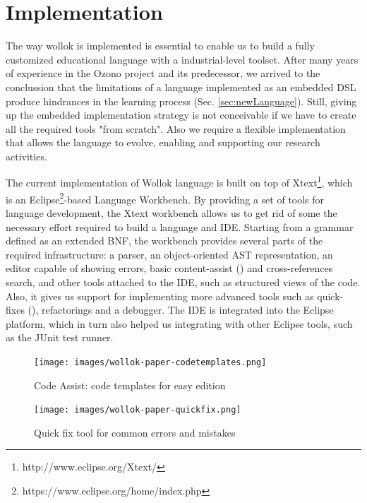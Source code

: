 \section{Implementation}
\label{sec:implementation}

The way wollok is implemented is essential to enable us to build a fully customized educational language with a industrial-level toolset.
After many years of experience in the Ozono project and its predecessor, we arrived to the conclussion that
the limitations of a language implemented as an embedded DSL produce hindrances in the learning process (\cf Sec. \ref{sec:newLanguage}).
Still, giving up the embedded implementation strategy is not conceivable if we have to create all the required tools "from scratch".
Also we require a flexible implementation that allows the language to evolve, enabling and supporting our research activities.

The current implementation of Wollok language is built on top of Xtext\footnote{http://www.eclipse.org/Xtext/}, 
which is an Eclipse\footnote{https://www.eclipse.org/home/index.php}-based Language Workbench\cite{fowler2005language}.
By providing a set of tools for language development, the Xtext workbench allows us to get rid of some the necessary effort required to build a language and IDE.
Starting from a grammar defined as an extended BNF, the workbench provides several parts of the required infrastructure: 
a parser, an object-oriented AST representation, an editor capable of showing errors, basic content-assist () and cross-references search, 
and other tools attached to the IDE, such as structured views of the code.
Also, it gives us support for implementing more advanced tools such as quick-fixes (), refactorings and a debugger.
The IDE is integrated into the Eclipse platform, which in turn also helped us integrating with other Eclipse tools, such as the JUnit test runner.

\begin{figure}[ht]
    \centering
	\texttt{[image: images/wollok-paper-codetemplates.png]}
    \caption{Code Assist: code templates for easy edition}
    \label{fig:codetemplates.png}
\end{figure}

\begin{figure}[ht]
    \centering
	\texttt{[image: images/wollok-paper-quickfix.png]}
    \caption{Quick fix tool for common errors and mistakes}
    \label{fig:quickfix.png}
\end{figure}

